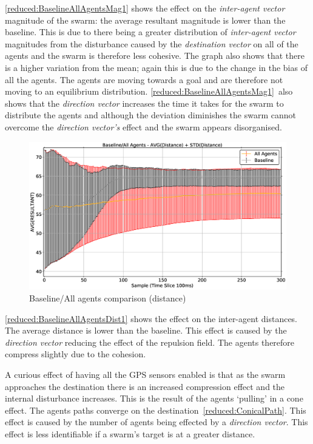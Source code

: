 \autoref{reduced:BaselineAllAgentsMag1} shows the effect on the \textit{inter-agent vector} magnitude of the swarm: the average resultant magnitude is lower than the baseline. This is due to there being a greater distribution of \textit{inter-agent vector} magnitudes from the disturbance caused by the \textit{destination vector} on all of the agents and the swarm is therefore less cohesive. The graph also shows that there is a higher variation from the mean; again this is due to the change in the bias of all the agents. The agents are moving towards a goal and are therefore not moving to an equilibrium distribution. \autoref{reduced:BaselineAllAgentsMag1}~also shows that the \textit{direction vector} increases the time it takes for the swarm to distribute the agents and although the deviation diminishes the swarm cannot overcome the \textit{direction vector's} effect and the swarm appears disorganised.
\begin{figure}[H]
\begin{center}
\includegraphics[width=14cm]{CHAPTER-6/figures/BaselineAllAgentsDist1}
\end{center}
\caption{Baseline/All agents comparison (distance)\label{reduced:BaselineAllAgentsDist1}}
\end{figure}

\autoref{reduced:BaselineAllAgentsDist1} shows the effect on the inter-agent distances. The average distance is lower than the baseline. This effect is caused by the \textit{direction vector} reducing the effect of the repulsion field. The agents therefore compress slightly due to the cohesion.

A curious effect of having all the GPS sensors enabled is that as the swarm approaches the destination there is an increased compression effect and the internal disturbance increases. This is the result of the agents `pulling' in a cone effect. The agents paths converge on the destination~\autoref{reduced:ConicalPath}. This effect is caused by the number of agents being effected by a \textit{direction vector}. This effect is less identifiable if a swarm's target is at a greater distance.  

